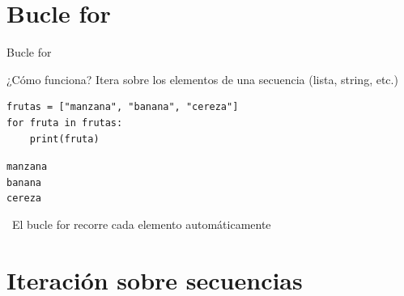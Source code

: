 \documentclass{beamer}
\begin{document}
\section{Bucle for}

\begin{frame}[fragile]{Bucle for \faRepeat}
\begin{conceptbox}{¿Cómo funciona?}
Itera sobre los elementos de una secuencia (lista, string, etc.)
\end{conceptbox}

\begin{lstlisting}
frutas = ["manzana", "banana", "cereza"]
for fruta in frutas:
    print(fruta)
\end{lstlisting}

\vspace{-0.2cm}
\begin{tcolorbox}[colback=green!10,colframe=green,title={\small\faArrowCircleRight \ Salida},coltitle=fg0,left=3pt,right=3pt,top=2pt,bottom=2pt,boxsep=1pt]
\small\texttt{manzana\\
banana\\
cereza}
\end{tcolorbox}

\vspace{-0.1cm}
\begin{notebox}
\small\faLightbulb\ El bucle for recorre cada elemento automáticamente
\end{notebox}
\end{frame}

\section{Iteración sobre secuencias}
\end{document}
